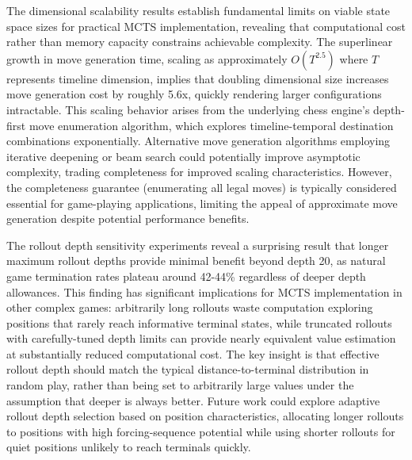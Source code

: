 \documentclass{article}
\begin{document}
The dimensional scalability results establish fundamental limits on viable state space sizes for practical MCTS implementation, revealing that computational cost rather than memory capacity constrains achievable complexity. The superlinear growth in move generation time, scaling as approximately $O(T^{2.5})$ where $T$ represents timeline dimension, implies that doubling dimensional size increases move generation cost by roughly 5.6x, quickly rendering larger configurations intractable. This scaling behavior arises from the underlying chess engine's depth-first move enumeration algorithm, which explores timeline-temporal destination combinations exponentially. Alternative move generation algorithms employing iterative deepening or beam search could potentially improve asymptotic complexity, trading completeness for improved scaling characteristics. However, the completeness guarantee (enumerating all legal moves) is typically considered essential for game-playing applications, limiting the appeal of approximate move generation despite potential performance benefits.

The rollout depth sensitivity experiments reveal a surprising result that longer maximum rollout depths provide minimal benefit beyond depth 20, as natural game termination rates plateau around 42-44\% regardless of deeper depth allowances. This finding has significant implications for MCTS implementation in other complex games: arbitrarily long rollouts waste computation exploring positions that rarely reach informative terminal states, while truncated rollouts with carefully-tuned depth limits can provide nearly equivalent value estimation at substantially reduced computational cost. The key insight is that effective rollout depth should match the typical distance-to-terminal distribution in random play, rather than being set to arbitrarily large values under the assumption that deeper is always better. Future work could explore adaptive rollout depth selection based on position characteristics, allocating longer rollouts to positions with high forcing-sequence potential while using shorter rollouts for quiet positions unlikely to reach terminals quickly.
\end{document}
